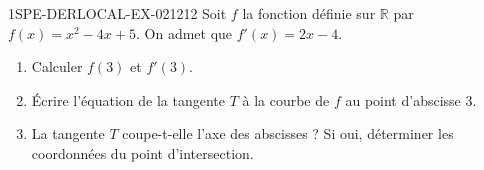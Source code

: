 \begin{exercice}{1SPE-DERLOCAL-EX-021}{2}{12}
Soit $f$ la fonction définie sur $\mathbb{R}$ par $f(x) = x^2 - 4x + 5$. On admet que $f'(x) = 2x - 4$.

\begin{enumerate}
  \item Calculer $f(3)$ et $f'(3)$.
  \item Écrire l'équation de la tangente $T$ à la courbe de $f$ au point d'abscisse $3$.
  \item La tangente $T$ coupe-t-elle l'axe des abscisses ? Si oui, déterminer les coordonnées du point d'intersection.
\end{enumerate}
\end{exercice}
